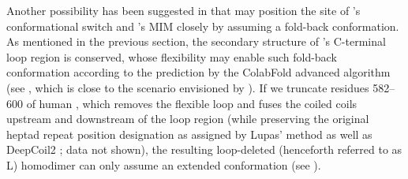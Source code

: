 Another possibility has been suggested in \cite{Structure1GO4, SpMad1} that  may position the site of 's conformational switch and 's MIM closely by assuming a fold-back conformation. As mentioned in the previous section, the secondary structure of 's C-terminal loop region is conserved, whose flexibility may enable such fold-back conformation according to the prediction by the ColabFold advanced algorithm (see , which is close to the scenario envisioned by \cite{SpMad1}). If we truncate residues 582--600 of human , which removes the flexible loop and fuses the coiled coils upstream and downstream of the loop region (while preserving the original heptad repeat position designation as assigned by Lupas' method \cite{LupasCOILS} as well as DeepCoil2 \cite{DeepCoil}; data not shown), the resulting loop-deleted  (henceforth referred to as \textDelta{}L) homodimer can only assume an extended conformation (see ).

